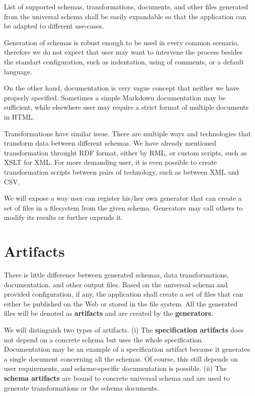 \begin{requirement}
  List of supported schemas, transformations, documents, and other files generated from the universal schema shall be easily expandable so that the application can be adapted to different use-cases.
\end{requirement}

Generation of schemas is robust enough to be used in every common scenario, therefore we do not expect that user may want to intervene the process besides the standart configuration, such as indentation, using of comments, or a default language.

On the other hand, documentation is very vague concept that neither we have properly specified. Sometimes a simple Markdown documentation may be sufficient, while elsewhere user may require a strict format of multiple documents in HTML.

Transformations have similar issue. There are multiple ways and technologies that transform data between different schemas. We have already mentioned transformation throught RDF format, either by RML, or custom scripts, such as XSLT for XML. For more demanding user, it is even possible to create transformation scripts between pairs of technology, such as between XML and CSV.

We will expose a way user can register his/her own generator that can create a set of files in a filesystem from the given schema. Generators may call others to modify its results or further expends it.

\section*{Artifacts}

There is little difference between generated schemas, data transformations, documentation, and other output files. Based on the universal schema and provided configuration, if any, the application shall create a set of files that can either be published on the Web or stored in the file system. All the generated files will be denoted as \textbf{artifacts} and are created by the \textbf{generators}.

We will distinguish two types of artifacts. (i) The \textbf{specification artifacts} does not depend on a concrete schema but uses the whole specification. Documentation may be an example of a specification artifact because it generates a single document concerning all the schemas. Of course, this still depends on user requirements, and scheme-specific documentation is possible. (ii) The \textbf{schema artifacts} are bound to concrete universal schema and are used to generate transformations or the schema documents.

